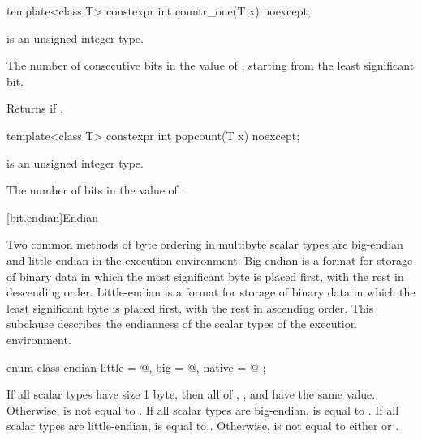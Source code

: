 \begin{itemdecl}
template<class T>
  constexpr int countr_one(T x) noexcept;
\end{itemdecl}

%
\begin{itemdescr}
\pnum
\constraints
{} is an unsigned integer type.

\pnum
\returns
The number of consecutive  bits in the value of ,
starting from the least significant bit.
\begin{note}
Returns  if .
\end{note}
\end{itemdescr}

\begin{itemdecl}
template<class T>
  constexpr int popcount(T x) noexcept;
\end{itemdecl}

%
\begin{itemdescr}
\pnum
\constraints
{} is an unsigned integer type.

\pnum
\returns
The number of  bits in the value of .
\end{itemdescr}

[bit.endian]{Endian}

\pnum
Two common methods of byte ordering in multibyte scalar types are big-endian
and little-endian in the execution environment. Big-endian is a format for
storage of binary data in which the most significant byte is placed first,
with the rest in descending order. Little-endian is a format for storage of
binary data in which the least significant byte is placed first, with the rest
in ascending order. This subclause describes the endianness of the scalar types
of the execution environment.

%
%
%
%
\begin{itemdecl}
enum class endian {
  little = @\seebelow@,
  big    = @\seebelow@,
  native = @\seebelow@
};
\end{itemdecl}

\begin{itemdescr}
\pnum
If all scalar types have size 1 byte, then all of ,
, and  have the same value.
Otherwise,  is not equal to .
If all scalar types are big-endian,  is
equal to .
If all scalar types are little-endian,  is
equal to .
Otherwise,  is not equal
to either  or .
\end{itemdescr}
